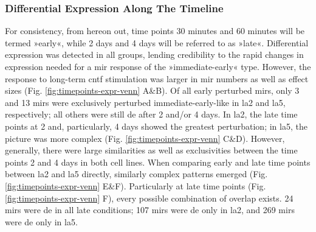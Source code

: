 \subsubsection{Differential Expression Along The Timeline} \label{sec:cellculture:along}
For consistency, from hereon out, time points 30 minutes and 60 minutes will be termed »early«, while 2 days and 4 days will be referred to as »late«. Differential expression was detected in all groups, lending credibility to the rapid changes in expression needed for a \ac{mir} response of the »immediate-early« type. However, the response to long-term \ac{cntf} stimulation was larger in \ac{mir} numbers as well as effect sizes (Fig. \ref{fig:timepoints-expr-venn} A\&B). Of all early perturbed \acp{mir}, only 3 and 13 \acp{mir} were exclusively perturbed immediate-early-like in \ac{la2} and \ac{la5}, respectively; all others were still \ac{de} after 2 and/or 4 days. In \ac{la2}, the late time points at 2 and, particularly, 4 days showed the greatest perturbation; in \ac{la5}, the picture was more complex (Fig. \ref{fig:timepoints-expr-venn} C\&D). However, generally, there were large similarities as well as exclusivities between the time points 2 and 4 days in both cell lines. When comparing early and late time points between \ac{la2} and \ac{la5} directly, similarly complex patterns emerged (Fig. \ref{fig:timepoints-expr-venn} E\&F). Particularly at late time points (Fig. \ref{fig:timepoints-expr-venn} F), every possible combination of overlap exists. 24 \acp{mir} were \ac{de} in all late conditions; 107 \acp{mir} were \ac{de} only in \ac{la2}, and 269 \acp{mir} were \ac{de} only in \ac{la5}. 

